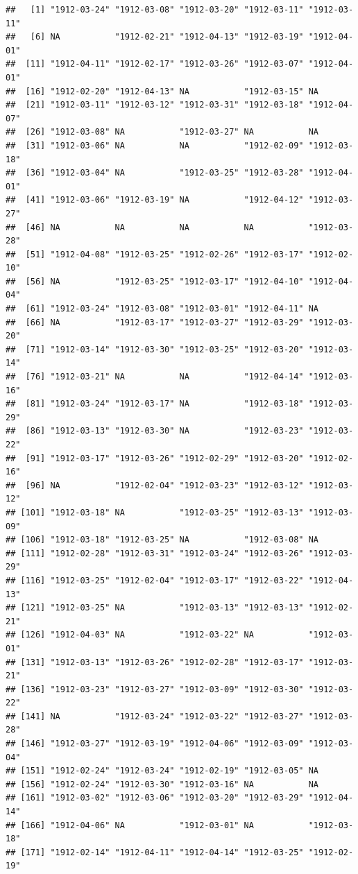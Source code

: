 \documentclass[11pt,]{book}
\begin{document}
\begin{verbatim}
##   [1] "1912-03-24" "1912-03-08" "1912-03-20" "1912-03-11" "1912-03-11"
##   [6] NA           "1912-02-21" "1912-04-13" "1912-03-19" "1912-04-01"
##  [11] "1912-04-11" "1912-02-17" "1912-03-26" "1912-03-07" "1912-04-01"
##  [16] "1912-02-20" "1912-04-13" NA           "1912-03-15" NA          
##  [21] "1912-03-11" "1912-03-12" "1912-03-31" "1912-03-18" "1912-04-07"
##  [26] "1912-03-08" NA           "1912-03-27" NA           NA          
##  [31] "1912-03-06" NA           NA           "1912-02-09" "1912-03-18"
##  [36] "1912-03-04" NA           "1912-03-25" "1912-03-28" "1912-04-01"
##  [41] "1912-03-06" "1912-03-19" NA           "1912-04-12" "1912-03-27"
##  [46] NA           NA           NA           NA           "1912-03-28"
##  [51] "1912-04-08" "1912-03-25" "1912-02-26" "1912-03-17" "1912-02-10"
##  [56] NA           "1912-03-25" "1912-03-17" "1912-04-10" "1912-04-04"
##  [61] "1912-03-24" "1912-03-08" "1912-03-01" "1912-04-11" NA          
##  [66] NA           "1912-03-17" "1912-03-27" "1912-03-29" "1912-03-20"
##  [71] "1912-03-14" "1912-03-30" "1912-03-25" "1912-03-20" "1912-03-14"
##  [76] "1912-03-21" NA           NA           "1912-04-14" "1912-03-16"
##  [81] "1912-03-24" "1912-03-17" NA           "1912-03-18" "1912-03-29"
##  [86] "1912-03-13" "1912-03-30" NA           "1912-03-23" "1912-03-22"
##  [91] "1912-03-17" "1912-03-26" "1912-02-29" "1912-03-20" "1912-02-16"
##  [96] NA           "1912-02-04" "1912-03-23" "1912-03-12" "1912-03-12"
## [101] "1912-03-18" NA           "1912-03-25" "1912-03-13" "1912-03-09"
## [106] "1912-03-18" "1912-03-25" NA           "1912-03-08" NA          
## [111] "1912-02-28" "1912-03-31" "1912-03-24" "1912-03-26" "1912-03-29"
## [116] "1912-03-25" "1912-02-04" "1912-03-17" "1912-03-22" "1912-04-13"
## [121] "1912-03-25" NA           "1912-03-13" "1912-03-13" "1912-02-21"
## [126] "1912-04-03" NA           "1912-03-22" NA           "1912-03-01"
## [131] "1912-03-13" "1912-03-26" "1912-02-28" "1912-03-17" "1912-03-21"
## [136] "1912-03-23" "1912-03-27" "1912-03-09" "1912-03-30" "1912-03-22"
## [141] NA           "1912-03-24" "1912-03-22" "1912-03-27" "1912-03-28"
## [146] "1912-03-27" "1912-03-19" "1912-04-06" "1912-03-09" "1912-03-04"
## [151] "1912-02-24" "1912-03-24" "1912-02-19" "1912-03-05" NA          
## [156] "1912-02-24" "1912-03-30" "1912-03-16" NA           NA          
## [161] "1912-03-02" "1912-03-06" "1912-03-20" "1912-03-29" "1912-04-14"
## [166] "1912-04-06" NA           "1912-03-01" NA           "1912-03-18"
## [171] "1912-02-14" "1912-04-11" "1912-04-14" "1912-03-25" "1912-02-19"

\end{verbatim}
\end{document}
